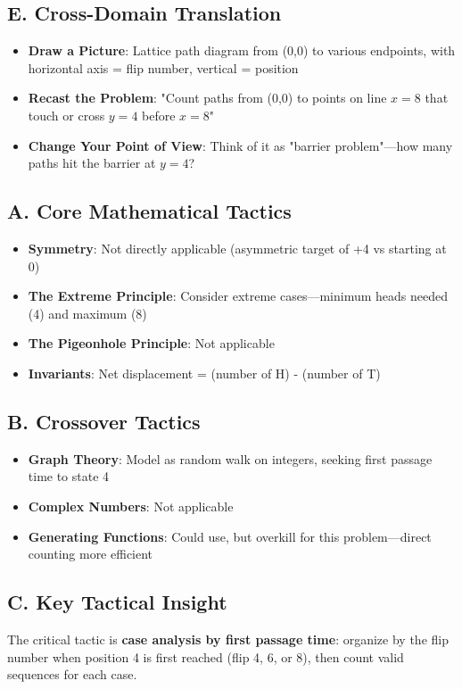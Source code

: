 \documentclass[]{article}
\begin{document}
\begin{strategicbox}
\subsection*{E. Cross-Domain Translation}
\begin{itemize}[leftmargin=*]
    \item \textbf{Draw a Picture}: Lattice path diagram from (0,0) to various endpoints, with horizontal axis = flip number, vertical = position
    \item \textbf{Recast the Problem}: "Count paths from (0,0) to points on line $x=8$ that touch or cross $y=4$ before $x=8$"
    \item \textbf{Change Your Point of View}: Think of it as "barrier problem"—how many paths hit the barrier at $y=4$?
\end{itemize}
\end{strategicbox}

\begin{tacticalbox}
\subsection*{A. Core Mathematical Tactics}
\begin{itemize}[leftmargin=*]
    \item \textbf{Symmetry}: Not directly applicable (asymmetric target of +4 vs starting at 0)
    \item \textbf{The Extreme Principle}: Consider extreme cases—minimum heads needed (4) and maximum (8)
    \item \textbf{The Pigeonhole Principle}: Not applicable
    \item \textbf{Invariants}: Net displacement = (number of H) - (number of T)
\end{itemize}

\subsection*{B. Crossover Tactics}
\begin{itemize}[leftmargin=*]
    \item \textbf{Graph Theory}: Model as random walk on integers, seeking first passage time to state 4
    \item \textbf{Complex Numbers}: Not applicable
    \item \textbf{Generating Functions}: Could use, but overkill for this problem—direct counting more efficient
\end{itemize}

\subsection*{C. Key Tactical Insight}
The critical tactic is \textbf{case analysis by first passage time}: organize by the flip number when position 4 is first reached (flip 4, 6, or 8), then count valid sequences for each case.

\end{tacticalbox}
\end{document}
